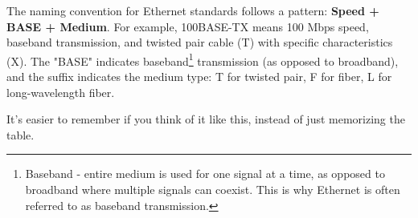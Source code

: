 \begin{tipblock}
    The naming convention for Ethernet standards follows a pattern: \textbf{Speed + BASE + Medium}. For example, 100BASE-TX means 100 Mbps speed, baseband transmission, and twisted pair cable (T) with specific characteristics (X). The "BASE" indicates baseband\footnote{
        Baseband - entire medium is used for one signal at a time, as opposed to broadband where multiple signals can coexist. This is why Ethernet is often referred to as baseband transmission.
    } transmission (as opposed to broadband), and the suffix indicates the medium type: T for twisted pair, F for fiber, L for long-wavelength fiber.

    It's easier to remember if you think of it like this, instead of just memorizing the table.
\end{tipblock}

